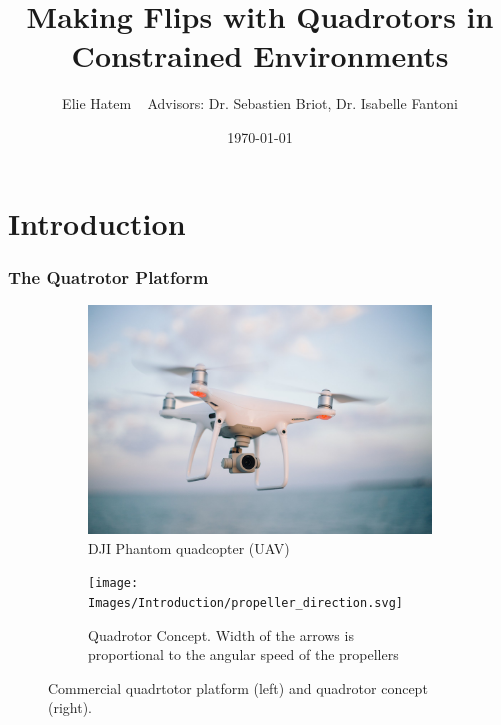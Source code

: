 \documentclass{thesisbeamer}
\title[Making Flips with Quadrotors in Constrained Environments]{Making Flips with Quadrotors in Constrained Environments}
\author[Elie Hatem]{Elie Hatem \newline ~ \newline \normalsize{Advisors: Dr. Sebastien Briot, Dr. Isabelle Fantoni}}
\date{\today}
\newcommand\Fontvi{\fontsize{9}{10}\selectfont}
\begin{document}
\MakeTitleNoFoot



\section{Introduction}

\begin{frame}
\frametitle{The Quatrotor Platform}
\Fontvi

\begin{figure}[t]
     \centering
     \begin{subfigure}[b]{0.45\textwidth}
         \centering
         \includegraphics[width=\textwidth]{Images/Introduction/drone}
         \caption[Caption for LOF]{DJI Phantom quadcopter (UAV)\protect\footnotemark}
         \label{fig:drone}
     \end{subfigure}
     \hfill
     \begin{subfigure}[b]{0.45\textwidth}
         \centering
         \texttt{[image: Images/Introduction/propeller\_direction.svg]}
         \caption{Quadrotor Concept. Width of the arrows is proportional to the angular speed of the propellers\protect\footnotemark}
         \label{fig:propeller_directions}
     \end{subfigure}
        \caption{Commercial quadrtotor platform (left) and quadrotor concept (right).}
        \label{fig:three graphs}
\end{figure}


\end{frame}
\end{document}
